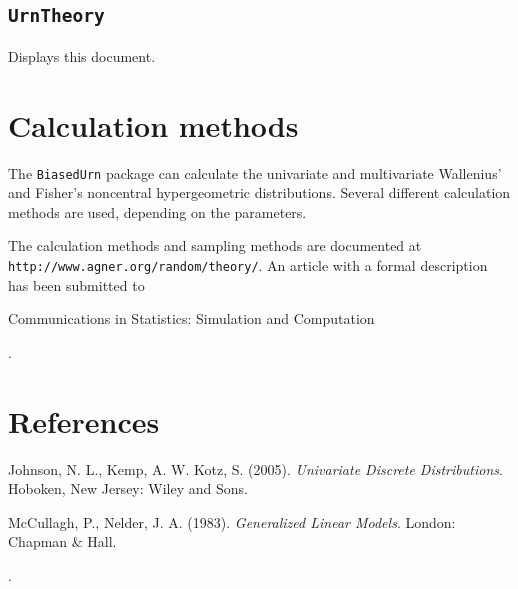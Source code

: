 \documentclass[a4paper]{article}
\begin{document}
\subsection{\tt UrnTheory}
%
Displays this document.


\section{Calculation methods}
%
The {\tt BiasedUrn} package can calculate the univariate 
and multivariate
Wallenius' and Fisher's noncentral hypergeometric distributions.
Several different calculation methods are used, depending on the 
parameters.

The calculation methods and sampling methods are documented at \\
{\tt http://www.agner.org/random/theory/}. An article with a formal
description has been submitted to 
\begin{emph}{Communications in Statistics: Simulation and Computation}\end{emph}.

\section{References}

\noindent Johnson, N. L., Kemp, A. W. Kotz, S. (2005). {\it
Univariate Discrete Distributions}. Hoboken, New Jersey: Wiley and
Sons.

\vskip 3mm
%
\noindent McCullagh, P., Nelder, J. A. (1983). {\it Generalized
Linear Models}. London: Chapman \& Hall.

\vskip 3mm
%
.
\end{document}

